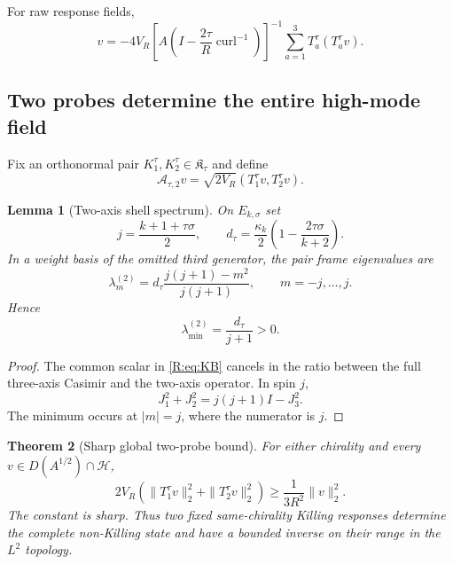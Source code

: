 \documentclass[
 aps,
 prd,
 reprint,
 amsmath,
 amssymb,
 nofootinbib,
 superscriptaddress
]{revtex4-2}
\newtheorem{theorem}{Theorem}[section]
\newtheorem{lemma}[theorem]{Lemma}
\theoremstyle{definition}
\theoremstyle{remark}
\newcommand{\cK}{\mathfrak K}
\newcommand{\cA}{\mathscr A}
\newcommand{\curl}{\operatorname{curl}}
\begin{document}
For raw response fields,
\begin{equation}
 \boxed{
 v
 =
 -4V_R
 \left[
 A\left(I-\frac{2\tau}{R}\curl^{-1}\right)
 \right]^{-1}
 \sum_{a=1}^3
 T_a^\tau(T_a^\tau v).
 }
 \label{R:eq:rawreconstruction}
\end{equation}

\subsection{Two probes determine the entire high-mode field}

Fix an orthonormal pair
$K_1^\tau,K_2^\tau\in\cK_\tau$ and define
\[
       \cA_{\tau,2}v
       =
       \sqrt{2V_R}(T_1^\tau v,T_2^\tau v).
\]

\begin{lemma}[Two-axis shell spectrum]
\label{R:lem:pair}
On $E_{k,\sigma}$ set
\[
       j=\frac{k+1+\tau\sigma}{2},
\qquad
       d_\tau=
       \frac{\kappa_k}{2}
       \left(1-\frac{2\tau\sigma}{k+2}\right).
\]
In a weight basis of the omitted third generator, the pair frame eigenvalues
are
\begin{equation}
 \lambda_m^{(2)}
 =
 d_\tau
 \frac{j(j+1)-m^2}{j(j+1)},
 \qquad
 m=-j,\ldots,j.
 \label{R:eq:pairlambda}
\end{equation}
Hence
\begin{equation}
 \boxed{
 \lambda_{\min}^{(2)}
 =
 \frac{d_\tau}{j+1}>0.
 }
 \label{R:eq:pairmin}
\end{equation}
\end{lemma}

\begin{proof}
The common scalar in \eqref{R:eq:KB} cancels in the ratio between the full
three-axis Casimir and the two-axis operator.  In spin $j$,
\[
       J_1^2+J_2^2=j(j+1)I-J_3^2.
\]
The minimum occurs at $|m|=j$, where the numerator is $j$.
\end{proof}

\begin{theorem}[Sharp global two-probe bound]
\label{R:thm:two}
For either chirality and every
$v\in D(A^{1/2})\cap\mathcal H$,
\begin{equation}
 \boxed{
 2V_R
 \left(
 \|T_1^\tau v\|_2^2+
 \|T_2^\tau v\|_2^2
 \right)
 \ge
 \frac{1}{3R^2}\|v\|_2^2.
 }
 \label{R:eq:twobound}
\end{equation}
The constant is sharp.  Thus two fixed same-chirality Killing responses
determine the complete non-Killing state and have a bounded inverse on their
range in the $L^2$ topology.
\end{theorem}
\end{document}
